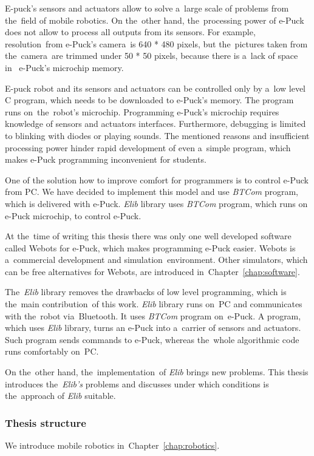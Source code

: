   E-puck's sensors and actuators allow to solve a~large scale of problems from the~field of mobile robotics. 
  On the~other hand, the~processing power of e-Puck does not allow to 
  process all outputs from its sensors. For example, resolution~from e-Puck's camera~is 640 * 480 pixels,
  but the~pictures taken from the~camera~are trimmed under 50 * 50 pixels, because there is a~lack of space in~
   e-Puck's microchip memory.
   
  E-puck robot and its sensors and actuators can be controlled only by a~low level C program,
  which needs to be downloaded to e-Puck's memory. The program runs on~the~robot's microchip.
  Programming e-Puck's microchip requires knowledge of sensors and actuators interfaces.
  Furthermore, debugging is limited to blinking with diodes or playing sounds.
  The mentioned reasons and insufficient processing power hinder rapid development 
  of even a~simple program, 
  which makes e-Puck programming inconvenient for students.

  One of the solution how to improve comfort for programmers is to control e-Puck from PC. 
  We have decided to implement this model and use {\it BTCom} program, which is delivered with e-Puck.
  {\it Elib} library uses {\it BTCom} program, which runs on e-Puck microchip, to control e-Puck.
  
  At the~time of writing this thesis there was only one well developed software called Webots for e-Puck, 
  which makes programming e-Puck easier.  
  Webots is a~commercial development and simulation~environment.
  Other simulators, which can be free alternatives for Webots, are introduced in~Chapter~\ref{chap:software}.
  
  The~{\it Elib} library removes the drawbacks of low level programming, 
  which is the~main contribution~of this work.
  {\it Elib} library runs on~PC and communicates with the~robot via~Bluetooth. 
  It uses {\it BTCom} program on~e-Puck.
  A program, which uses {\it Elib} library, 
  turns an e-Puck into a~carrier of sensors and actuators. 
  Such program sends commands to e-Puck,
  whereas the~whole algorithmic code runs comfortably on~PC.
  
  On the~other hand, the~implementation~of {\it Elib} brings new problems.
  This thesis introduces the~{\it Elib's} problems and discusses 
  under which conditions is the~approach of {\it Elib} suitable.	
  \subsubsection*{Thesis structure}
  We introduce mobile robotics in~Chapter~\ref{chap:robotics}.

